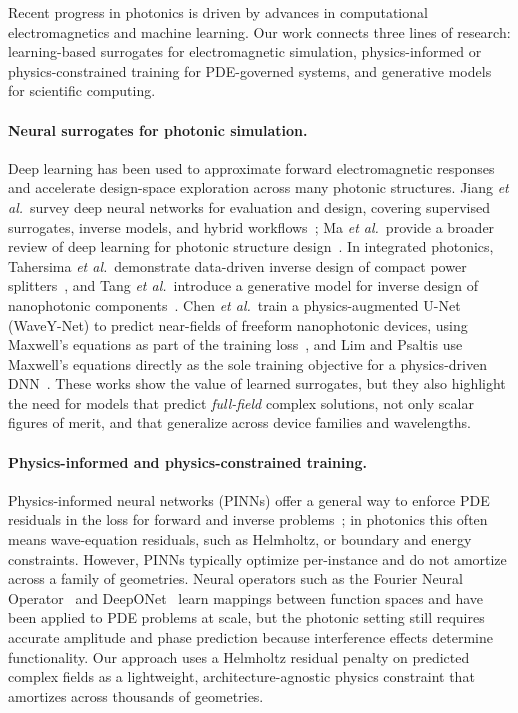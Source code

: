 \documentclass[%
 reprint,
 amsmath,amssymb,
 aps,
floatfix,
]{revtex4-2}
\begin{document}
Recent progress in photonics is driven by advances in computational electromagnetics and machine learning. Our work connects three lines of research: learning-based surrogates for electromagnetic simulation, physics-informed or physics-constrained training for PDE-governed systems, and generative models for scientific computing.

\paragraph{Neural surrogates for photonic simulation.}
Deep learning has been used to approximate forward electromagnetic responses and accelerate design-space exploration across many photonic structures. Jiang \emph{et al.}\ survey deep neural networks for evaluation and design, covering supervised surrogates, inverse models, and hybrid workflows~\cite{Jiang2021DeepNNPhotonicDevices}; Ma \emph{et al.}\ provide a broader review of deep learning for photonic structure design~\cite{Ma2021DLPhotonicsReview}. In integrated photonics, Tahersima \emph{et al.}\ demonstrate data-driven inverse design of compact power splitters~\cite{Tahersima2019DNNSplitters}, and Tang \emph{et al.}\ introduce a generative model for inverse design of nanophotonic components~\cite{Tang2020GenerativeLPR}. Chen \emph{et al.}\ train a physics-augmented U-Net~\cite{Ronneberger2015UNet} (WaveY-Net) to predict near-fields of freeform nanophotonic devices, using Maxwell's equations as part of the training loss~\cite{Chen2022WaveYNet}, and Lim and Psaltis use Maxwell's equations directly as the sole training objective for a physics-driven DNN~\cite{Lim2022MaxwellNet}. These works show the value of learned surrogates, but they also highlight the need for models that predict \emph{full-field} complex solutions, not only scalar figures of merit, and that generalize across device families and wavelengths.

\paragraph{Physics-informed and physics-constrained training.}
Physics-informed neural networks (PINNs) offer a general way to enforce PDE residuals in the loss for forward and inverse problems~\cite{Raissi2019PINNs}; in photonics this often means wave-equation residuals, such as Helmholtz, or boundary and energy constraints. However, PINNs typically optimize per-instance and do not amortize across a family of geometries. Neural operators such as the Fourier Neural Operator~\cite{Li2021FNO} and DeepONet~\cite{Lu2021DeepONet} learn mappings between function spaces and have been applied to PDE problems at scale, but the photonic setting still requires accurate amplitude and phase prediction because interference effects determine functionality. Our approach uses a Helmholtz residual penalty on predicted complex fields as a lightweight, architecture-agnostic physics constraint that amortizes across thousands of geometries.
\end{document}

